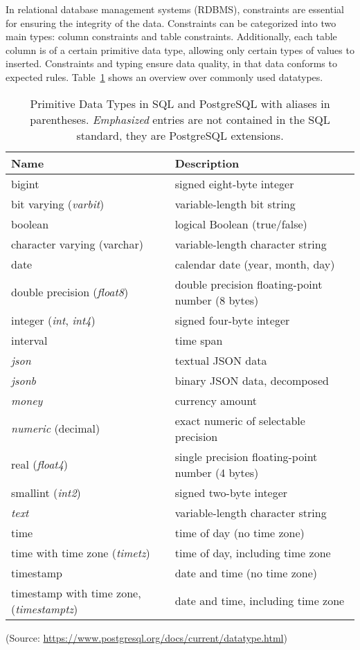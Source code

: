 In relational database management systems (RDBMS), constraints are essential for ensuring the integrity of the data. Constraints can be categorized into two main types: column constraints and table constraints. Additionally, each table column is of a certain primitive data type, allowing only certain types of values to inserted. Constraints and typing ensure data quality, in that data conforms to expected rules. Table~\ref{tab:datatypes} shows an overview over commonly used datatypes. 

\begin{table}
\renewcommand{\arraystretch}{1.25}
\begin{tabularx}{\linewidth}{l|X} \hline
\textbf{Name} & \textbf{Description} \\ \hline
bigint & signed eight-byte integer \\
bit varying (\emph{varbit}) &	variable-length bit string\\
boolean & logical Boolean (true/false)\\
character varying (varchar) & variable-length character string\\
date &	calendar date (year, month, day)\\
double precision (\emph{float8}) & double precision floating-point number (8 bytes)\\
integer (\emph{int}, \emph{int4}) &	signed four-byte integer\\
interval & time span\\
\emph{json} & 	textual JSON data\\
\emph{jsonb} &	binary JSON data, decomposed\\
\emph{money} & currency amount\\
\emph{numeric} (decimal) & exact numeric of selectable precision\\
real (\emph{float4}) & single precision floating-point number (4 bytes)\\
smallint (\emph{int2}) & signed two-byte integer\\
\emph{text} &	variable-length character string\\
time & time of day (no time zone)\\
time with time zone (\emph{timetz}) & time of day, including time zone\\
timestamp & date and time (no time zone)\\
timestamp with time zone, (\emph{timestamptz}) & date and time, including time zone\\ \hline
\end{tabularx}
 (\footnotesize Source: \url{https://www.postgresql.org/docs/current/datatype.html})
\caption[Primitive Data Types in SQL and PostgreSQL]{Primitive Data Types in SQL and PostgreSQL with aliases in parentheses. \emph{Emphasized} entries are not contained in the SQL standard, they are PostgreSQL extensions.}
\label{tab:datatypes}
\end{table}

